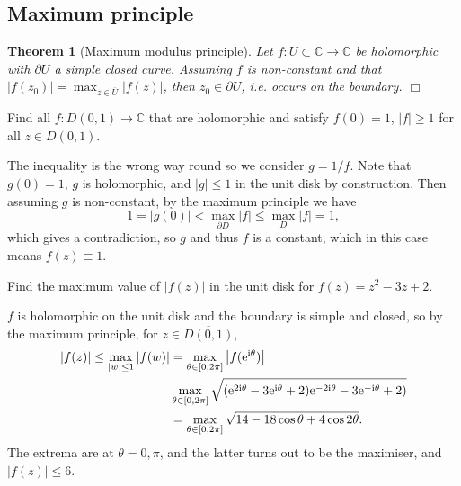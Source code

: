 \documentclass[letter-paper]{tufte-book}
\newtheorem{theorem}{\color{pastel-blue}Theorem}[section]
\newenvironment{example}[1][Example]{\begin{trivlist}
\item[\hskip \labelsep {\bfseries #1}]}{\end{trivlist}}
\newcommand{\ex}{\mathrm{e}}
\newcommand{\zi}{{\rm i}}
\newcommand{\qedwhite}{\hfill \ensuremath{\Box}}
\begin{document}

\subsection{Maximum principle}

\begin{theorem}[Maximum modulus principle]
  Let $f: U \subset \mathbb{C} \to \mathbb{C}$ be holomorphic with $\partial U$
  a simple closed curve. Assuming $f$ is non-constant and that $|f(z_0)| =
  \max_{z\in\overline{U}}|f(z)|$, then $z_0 \in \partial U$, i.e. occurs on the
  boundary. \qedwhite
\end{theorem}

\begin{example}
  Find all $f: D(0,1) \to \mathbb{C}$ that are holomorphic and satisfy $f(0) =
  1$, $|f| \geq 1$ for all $z \in D(0, 1)$.
  
  The inequality is the wrong way round so we consider $g = 1/f$. Note that
  $g(0) = 1$, $g$ is holomorphic, and $|g| \leq 1$ in the unit disk by
  construction. Then assuming $g$ is non-constant, by the maximum principle we
  have
  \begin{equation*}
    1 = |g(0)| < \max_{\partial D} |f| \leq \max_D |f| = 1,
  \end{equation*}
  which gives a contradiction, so $g$ and thus $f$ is a constant, which in this
  case means $f(z) \equiv 1$.
\end{example}

\begin{example}
  Find the maximum value of $|f(z)|$ in the unit disk for $f(z) = z^2 - 3z + 2$.
  
  $f$ is holomorphic on the unit disk and the boundary is simple and closed, so
  by the maximum principle, for $z \in \overline{D(0, 1)}$,
  \begin{align*}
    |f(z)| \leq \max_{|w|\leq 1} |f(w)| &= \max_{\theta \in [0, 2\pi]}\left|f(\ex^{\zi\theta})\right|\\
      & \max_{\theta \in [0, 2\pi]} \sqrt{(\ex^{2\zi\theta}-3\ex^{\zi\theta} + 2)\ex^{-2\zi\theta}-3\ex^{-\zi\theta} + 2)}\\
      & = \max_{\theta \in [0, 2\pi]} \sqrt{14 - 18 \cos\theta + 4\cos 2\theta}.
  \end{align*}
  The extrema are at $\theta = 0, \pi$, and the latter turns out to be the
  maximiser, and $|f(z)| \leq 6$.
\end{example}

\end{document}
